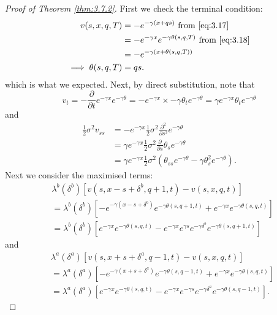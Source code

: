 \begin{proof}[Proof of Theorem \ref{thm:3.7.2}]
    First we check the terminal condition:
    \begin{align*}
        v(s,x,q,T)&=-e^{-\gamma(x+qs)}\textrm{ from \eqref{eq:3.17}}\\
        &=-e^{-\gamma x}e^{-\gamma\theta(s,q,T)}\textrm{ from \eqref{eq:3.18}}\\
        &=-e^{-\gamma(x+\theta(s,q,T))}\\
        \implies \theta(s,q,T)&=qs.
    \end{align*}
    which is what we expected. Next, by direct substitution, note that
    \begin{equation*}
        v_t = -\frac{\partial}{\partial t}e^{-\gamma x}e^{-\gamma\theta}=-e^{-\gamma x}\times-\gamma\theta_te^{-\gamma\theta}=\gamma e^{-\gamma x}\theta_te^{-\gamma\theta}
    \end{equation*}
    and 
    \begin{align*}
        \frac{1}{2}\sigma^2v_{ss}&=-e^{-\gamma x}\frac{1}{2}\sigma^2\frac{\partial^2}{\partial s^2}e^{-\gamma\theta}\\
        &=\gamma e^{-\gamma x}\frac{1}{2}\sigma^2\frac{\partial}{\partial s}\theta_se^{-\gamma\theta}\\
        &=\gamma e^{-\gamma x}\frac{1}{2}\sigma^2\left(\theta_{ss}e^{-\gamma\theta}-\gamma\theta_s^2e^{-\gamma\theta}\right).
    \end{align*}
    Next we consider the maximised terms:
    \begin{align*}
        &\lambda^b(\delta^b)[v(s,x-s+\delta^b,q+1,t)-v(s,x,q,t)]\\
        &=\lambda^b(\delta^b)[-e^{-\gamma (x-s+\delta^b)}e^{-\gamma\theta(s,q+1,t)}+e^{-\gamma x}e^{-\gamma\theta(s,q,t)}]\\
        &=\lambda^b(\delta^b)[e^{-\gamma x}e^{-\gamma\theta(s,q,t)}-e^{-\gamma x}e^{\gamma s}e^{-\gamma \delta^b}e^{-\gamma\theta(s,q+1,t)}]
    \end{align*}
    and
    \begin{align*}
        &\lambda^a(\delta^a)[v(s,x+s+\delta^a,q-1,t)-v(s,x,q,t)]\\
        &=\lambda^a(\delta^a)[-e^{-\gamma (x+s+\delta^a)}e^{-\gamma\theta(s,q-1,t)}+e^{-\gamma x}e^{-\gamma\theta(s,q,t)}]\\
        &=\lambda^a(\delta^a)[e^{-\gamma x}e^{-\gamma\theta(s,q,t)}-e^{-\gamma x}e^{-\gamma s}e^{-\gamma\delta^a}e^{-\gamma\theta(s,q-1,t)}].
    \end{align*}

\end{proof}
